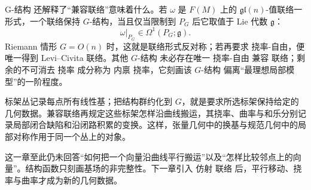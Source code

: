 G-结构 还解释了“兼容联络”意味着什么。若 $\omega$ 是 $F(M)$ 上的 $\mathfrak{gl}(n)$-值联络一形式，一个联络保持 $G$-结构，当且仅当限制到 $P_G$ 后它取值于 Lie 代数 $\mathfrak g$：
\begin{equation*}\omega|_{P_G}\in\Omega^1(P_G;\mathfrak g).\end{equation*}
Riemann 情形 $G=O(n)$ 时，这就是联络形式反对称；若再要求 挠率-自由，便唯一得到 Levi--Civita 联络。其他 $G$-结构 未必存在唯一 挠率-自由 兼容 联络；剩余的不可消去 挠率 成分称为 内禀 挠率，它刻画该 $G$-结构 偏离“最理想局部模型”的一阶程度。

标架丛记录每点所有线性基；把结构群约化到 $G$，就是要求所选标架保持给定的几何数据。兼容联络再规定这些标架怎样沿曲线搬运，其挠率、曲率与和乐分别记录局部闭合缺陷和沿闭路积累的变换。这样，张量几何中的换基与规范几何中的局部对称作用于同一个丛上的对象。

这一章至此仍未回答“如何把一个向量沿曲线平行搬运”以及“怎样比较邻点上的向量”。结构函数只刻画基场的非完整性。下一章引入 仿射 联络 后，平行移动、挠率与曲率才成为新的几何数据。

